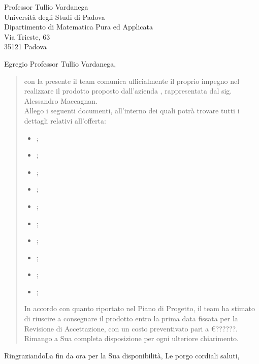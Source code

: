 \date{Padova, 22 Gennaio 2016}
\begin{letter}{
	Professor Tullio Vardanega \\
	Università degli Studi di Padova \\
	Dipartimento di Matematica Pura ed Applicata \\
	Via Trieste, 63 \\
	35121 Padova
}
\signature{
\begin{center}
\textit{
\Responsabile{} \\
Responsabile \GroupName{}
}
\end{center}
}
\opening{Egregio Professor Tullio Vardanega,}
\begin{quotation}
con la presente il team \GroupName comunica ufficialmente il proprio impegno nel realizzare il prodotto \ProjectName proposto dall'azienda \Proponente, rappresentata dal sig. Alessandro Maccagnan. \\
Allego i seguenti documenti, all'interno dei quali potrà trovare tutti i dettagli relativi all'offerta:
\begin{itemize}
\item \AnalisiDeiRequisiti{};
\item \DefinizioneDiProdotto{};
\item \Glossario{};
\item \ManualeAdmin{};
\item \ManualeSviluppatore{};
\item \ManualeUtente{};
\item \NormeDiProgetto{};
\item \PianoDiProgetto{};
\item \PianoDiQualifica{};
\item \SpecificaTecnica{};
\end{itemize}
In accordo con quanto riportato nel Piano di Progetto, il team ha stimato di riuscire a consegnare il prodotto entro la prima data fissata per la Revisione di Accettazione, con un costo preventivato pari a \euro ??????.\\ %
Rimango a Sua completa disposizione per ogni ulteriore chiarimento.
\end{quotation}
\closing{RingraziandoLa fin da ora per la Sua disponibilità, Le porgo cordiali saluti,}
\end{letter}
